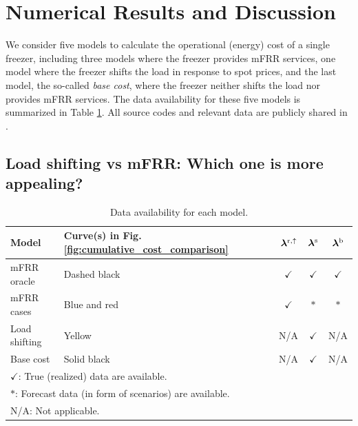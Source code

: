\section{Numerical Results and Discussion}\label{sec:results}
%
We consider five models to calculate the operational (energy) cost of a single freezer, including three models where the freezer provides mFRR services, one model where the freezer shifts the load in response to spot prices, and the last model, the so-called \textit{base cost}, where the freezer neither shifts the load nor provides mFRR services. The data availability for these five models is summarized in
Table \ref{tab:price_visibility}. All source codes and relevant data are publicly shared in \cite{code}.

\vspace{-2mm}
\subsection{Load shifting vs mFRR: Which one is more appealing?}
%
\begin{table}[t]
    \caption{Data availability for each model.}
    \label{tab:price_visibility}
    \centering
    \begin{tabular}{llccc}
        \toprule
        Model         & Curve(s) in Fig. \ref{fig:cumulative_cost_comparison} & $\bm{\lambda}^{\rm{r},\uparrow}$ & $\bm{\lambda}^{\rm{s}}$ & $\bm{\lambda}^{\rm{b}}$ \\
        \midrule
        mFRR oracle   & Dashed black                                          & $\checkmark$                     & $\checkmark$            & $\checkmark$            \\
        mFRR cases    & Blue and red                                          & $\checkmark$                     & $\ast$                  & $\ast$                  \\
        Load shifting & Yellow                                                & N/A                              & $\checkmark$            & N/A                     \\
        Base cost     & Solid black                                           & N/A                              & $\checkmark$            & N/A                     \\
        \bottomrule
        \multicolumn{5}{l}{$\checkmark$: True (realized) data are available.}                                                                                        \\
        \multicolumn{5}{l}{$\ast$: Forecast data (in form of scenarios) are available.}                                                                              \\
        \multicolumn{5}{l}{N/A: Not applicable.}
    \end{tabular}
    \vspace{-3mm}
\end{table}




